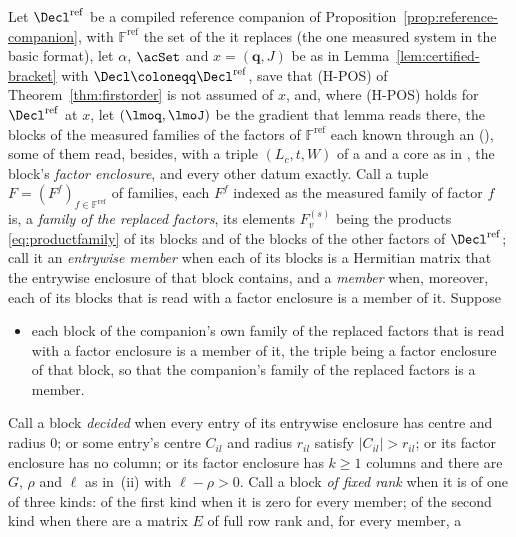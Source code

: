 \begin{lemma}\label{lem:certified-bracket-enclosed}
Let $\Decl^{\mathrm{ref}}$ be a compiled reference companion of
Proposition~\ref{prop:reference-companion}, with $\mathbb{F}^{\mathrm{ref}}$
the set of the  it replaces (the one
measured system in the basic format), let $\alpha$, $\acSet$ and
$x=(\mathbf q,J)$ be as in Lemma~\ref{lem:certified-bracket} with
$\Decl\coloneqq\Decl^{\mathrm{ref}}$, save that (H-POS) of
Theorem~\ref{thm:firstorder} is not assumed of $x$, and, where (H-POS) holds
for $\Decl^{\mathrm{ref}}$ at $x$, let $(\lmoq,\lmoJ)$ be the gradient that
lemma reads there, the blocks of the measured families of the factors of
$\mathbb{F}^{\mathrm{ref}}$ each known through an 
(), some of them read, besides, with a
triple $(L_c,t,W)$ of a  and a core as in
, the block's \emph{factor
enclosure}, and every other datum exactly. Call a tuple
$F=(F^{f})_{f\in\mathbb{F}^{\mathrm{ref}}}$ of families, each $F^{f}$
indexed as the measured family of factor $f$ is, a \emph{family of the
replaced factors}, its elements $F^{(s)}_v$ being the products
\eqref{eq:productfamily} of its blocks and of the blocks of the other factors
of $\Decl^{\mathrm{ref}}$; call it an \emph{entrywise member} when each of
its blocks is a Hermitian matrix that the entrywise enclosure of that block
contains, and a \emph{member} when, moreover, each of its blocks that is read
with a factor enclosure is a member of it. Suppose
\begin{itemize}[leftmargin=4.6em]
\item[(H-FAC)] each block of the companion's own family of the replaced
  factors that is read with a factor enclosure is a member of it, the triple
  being a factor enclosure of that block, so that the companion's family of
  the replaced factors is a member.
\end{itemize}
Call a block \emph{decided} when every entry of its entrywise enclosure has
centre and radius $0$; or some entry's centre $C_{il}$ and radius $r_{il}$
satisfy $|C_{il}|>r_{il}$; or its factor enclosure has no column; or its
factor enclosure has $k\ge1$ columns and there are $G$, $\rho$ and $\ell$ as
in \,(ii) with
$\ell-\rho>0$. Call a block \emph{of fixed rank} when it is of one of three
kinds: of the first kind when it is zero for every member; of the second kind
when there are a matrix $E$ of full row rank and, for every member, a

\end{lemma}
